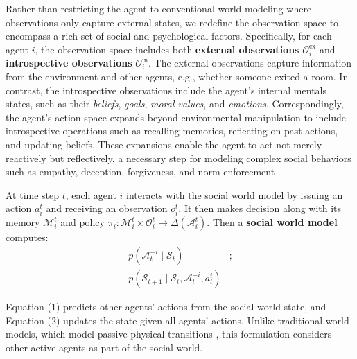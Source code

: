 Rather than restricting the agent to conventional world modeling where observations only capture external states, we redefine the observation space to encompass a rich set of social and psychological factors. Specifically, for each agent $i$, the observation space includes both \textbf{external observations} $\mathcal{O}^{\text{ex}}_i$ and \textbf{introspective observations} $\mathcal{O}^{\text{in}}_i$. The external observations capture information from the environment and other agents, e.g., whether someone exited a room. 
In contrast, the introspective observations include the agent’s internal mentals states, such as their \textit{beliefs}, \textit{goals}, \textit{moral values}, and \textit{emotions}.
Correspondingly, the agent’s action space expands beyond environmental manipulation to include introspective operations such as recalling memories, reflecting on past actions, and updating beliefs. These expansions enable the agent to act not merely reactively but reflectively, a necessary step for modeling complex social behaviors such as empathy, deception, forgiveness, and norm enforcement \citep{shen2024heartfeltnarrativestracingempathy, su2025ailiedarexaminetradeoffutility, forbes2021socialchemistry101learning}.

At time step $t$, each agent $i$ interacts with the social world model by issuing an action $a_i^t$ and receiving an observation $o_i^t$. It then makes decision along with its memory $\mathcal{M}_i^t$ and policy $\pi_i: \mathcal{M}_i^t \times \mathcal{O}_i^t \rightarrow \Delta(\mathcal{A}_i^t)$.
Then a \textbf{social world model} computes:
\begin{align}
   p(\mathcal{A}_t^{-i} \mid \mathcal{S}_t) &\text{;} \\
   p(\mathcal{S}_{t+1} \mid \mathcal{S}_{t}, \mathcal{A}_t^{-i}, a_t^i) &
\end{align}

Equation (1) predicts other agents’ actions from the social world state, and Equation (2) updates the state given all agents’ actions.
Unlike traditional world models, which model passive physical transitions \citep{worldmodels2018david, worldmodels2023xiang, xiang2024pandorageneralworldmodel}, this formulation considers other active agents as part of the social world.

